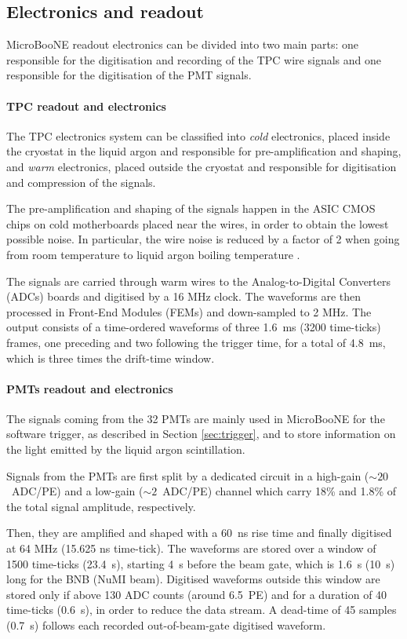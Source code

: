 \subsection{Electronics and readout}
MicroBooNE readout electronics can be divided into two main parts: one responsible for the digitisation and recording of the TPC wire signals and one responsible for the digitisation of the PMT signals. 

\paragraph{TPC readout and electronics}
The TPC electronics system can be classified into \emph{cold} electronics, placed inside the cryostat in the liquid argon and responsible for pre-amplification and shaping, and \emph{warm} electronics, placed outside the cryostat and responsible for digitisation and compression of the signals.

The pre-amplification and shaping of the signals happen in the ASIC CMOS chips on cold motherboards placed near the wires, in order to obtain the lowest possible noise. In particular, the wire noise is reduced by a factor of 2 when going from room temperature to liquid argon boiling temperature \cite{Chen:2012kv}. 

The signals are carried through warm wires to the Analog-to-Digital Converters (ADCs) boards and digitised by a 16 MHz clock. The waveforms are then processed in Front-End Modules (FEMs) and down-sampled to 2 MHz. The output consists of a time-ordered waveforms of three 1.6~ms (3200 time-ticks) frames, one preceding and two following the trigger time, for a total of 4.8~ms, which is three times the drift-time window. 

\paragraph{PMTs readout and electronics}
The signals coming from the 32 PMTs are mainly used in MicroBooNE for the software trigger, as described in Section \ref{sec:trigger}, and to store information on the light emitted by the liquid argon scintillation.

Signals from the PMTs are first split by a dedicated circuit in a high-gain ($\sim20$~ADC/PE) and a low-gain ($\sim2$~ADC/PE) channel which carry 18\% and 1.8\% of the total signal amplitude, respectively.

Then, they are amplified and shaped with a 60~ns rise time and finally digitised at 64 MHz (15.625 ns time-tick). The waveforms are stored over a window of 1500 time-ticks (23.4~\si{\micro}s), starting 4~\si{\micro}s before the beam gate, which is 1.6~\si{\micro}s (10~\si{\micro}s) long for the BNB (NuMI beam). Digitised waveforms outside this window are stored only if above 130 ADC counts (around 6.5~PE) and for a duration of 40 time-ticks (0.6~\si{\micro}s), in order to reduce the data stream. A dead-time of 45 samples (0.7~\si{\micro}s) follows each recorded out-of-beam-gate digitised waveform.



